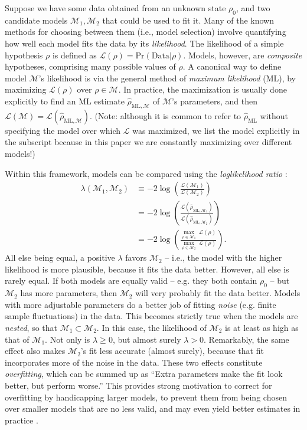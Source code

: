 \documentclass[aps,pra, twocolumn]{revtex4-1}
\newcommand{\M}{\mathcal{M}}
\newcommand{\cL}{\mathcal{L}}
\newcommand{\rhohat}{\hat{\rho}}
\newcommand{\rhoML}[1]{\rhohat_{\scriptscriptstyle{\mathrm{ML},#1}}}
\begin{document}
Suppose we have some data obtained from an unknown state $\rho_{0}$, and two candidate models $\M_{1}, \M_{2}$ that could be used to fit it.  Many of the known methods for choosing between them (i.e., model selection) involve quantifying how well each model fits the data by its \emph{likelihood}.  The likelihood of a simple hypothesis $\rho$ is defined as $\mathcal{L}(\rho) = \mathrm{Pr}(\mathrm{Data}|\rho)$.  Models, however, are \emph{composite} hypotheses, comprising many possible values of $\rho$.  A canonical way to define model $\M$'s likelihood is via the general method of \emph{maximum likelihood} (ML), by maximizing $\cL(\rho)$ over $\rho\in\M$.  In practice, the maximization is usually done explicitly to find an ML estimate $\hat{\rho}_{\mathrm{ML},\M}$ \cite{Hradil1997, JamesPRA2001, Blume-Kohout2010} of $\M$'s parameters, and then $\cL(\M) = \cL(\hat{\rho}_{\mathrm{ML},\M})$.  (Note: although it is common to refer to $\hat\rho_{\mathrm{ML}}$ without specifying the model over which $\cL$ was maximized, we list the model explicitly in the subscript because in this paper we are constantly maximizing over different models!)

Within this framework, models can be compared using the \emph{loglikelihood ratio} \cite{Neyman1933, Blume-Kohout2010, Moroder2013}:
\begin{align}
\lambda(\M_{1}, \M_{2}) &\equiv -2 \log \left(\frac{\cL(\M_{1})}{\cL(\M_{2})}\right)\\
&= -2 \log \left(\frac{\cL(\rhoML{\M_{1}})}{\cL(\rhoML{\M_{2}})}\right)\\
&= -2 \log \left(\frac{\underset{\rho \in \M_{1}}{\max}~\cL(\rho)}{\underset{\rho \in \M_{2}}{\max}~\cL(\rho)}\right).
\end{align}
All else being equal, a positive $\lambda$ favors $\M_2$ -- i.e., the model with the higher likelihood is more plausible, because it fits the data better.  However, all else is rarely equal.  If both models are equally valid -- e.g. they both contain $\rho_0$ -- but $\M_2$ has more parameters, then $\M_2$ will very probably fit the data better.  Models with more adjustable parameters do a better job of fitting \emph{noise} (e.g. finite sample fluctuations) in the data.  This becomes strictly true when the models are \emph{nested}, so that $\M_{1} \subset \M_{2}$.  In this case, the likelihood of $\M_{2}$ is at least as high as that of $\M_{1}$.  Not only is $\lambda \geq 0$, but almost surely $\lambda > 0$.  Remarkably, the same effect also makes $\M_{2}$'s fit less accurate (almost surely), because that fit incorporates more of the noise in the data.  These two effects constitute \emph{overfitting}, which can be summed up as ``Extra parameters make the fit look better, but perform worse.''  This provides strong motivation to correct for overfitting by handicapping larger models, to prevent them from being chosen over smaller models that are no less valid, and may even yield better estimates in practice \cite{Akaike1974}.
\end{document}
